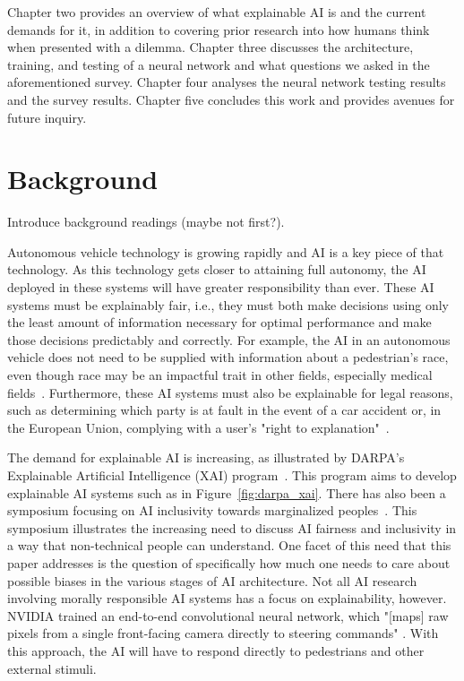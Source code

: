 \documentclass[]{report}
\begin{document}
Chapter two provides an overview of what explainable AI is and the current demands for it, in
addition to covering prior research into how humans think when presented with a dilemma. Chapter
three discusses the architecture, training, and testing of a neural network and what questions we
asked in the aforementioned survey. Chapter four analyses the neural network testing results and the
survey results. Chapter five concludes this work and provides avenues for future inquiry.


\FloatBarrier
\chapter{Background}

Introduce background readings (maybe not first?).

Autonomous vehicle technology is growing rapidly and AI is a key piece of that technology. As this
technology gets closer to attaining full autonomy, the AI deployed in these systems will have
greater responsibility than ever. These AI systems must be explainably fair, i.e., they must both
make decisions using only the least amount of information necessary for optimal performance and make
those decisions predictably and correctly. For example, the AI in an autonomous vehicle does not
need to be supplied with information about a pedestrian's race, even though race may be an impactful
trait in other fields, especially medical fields~\cite{sickeCellDisease}. Furthermore, these AI
systems must also be explainable for legal reasons, such as determining which party is at fault in
the event of a car accident or, in the European Union, complying with a user's "right to
explanation"~\cite{goodman2017european}.

The demand for explainable AI is increasing, as illustrated by DARPA's Explainable Artificial
Intelligence (XAI) program~\cite{gunning2016explainable}. This program aims to develop explainable
AI systems such as in Figure~\ref{fig:darpa_xai}. There has also been a symposium focusing on AI
inclusivity towards marginalized peoples~\cite{berkmanKleinCenterAI2017,aiAndInclusionSymposium}.
This symposium illustrates the increasing need to discuss AI fairness and inclusivity in a way that
non-technical people can understand. One facet of this need that this paper addresses is the
question of specifically how much one needs to care about possible biases in the various stages of
AI architecture. Not all AI research involving morally responsible AI systems has a focus on
explainability, however. NVIDIA trained an end-to-end convolutional neural network, which "[maps]
raw pixels from a single front-facing camera directly to steering commands" \cite{bojarski2016end}.
With this approach, the AI will have to respond directly to pedestrians and other external stimuli.
\end{document}
